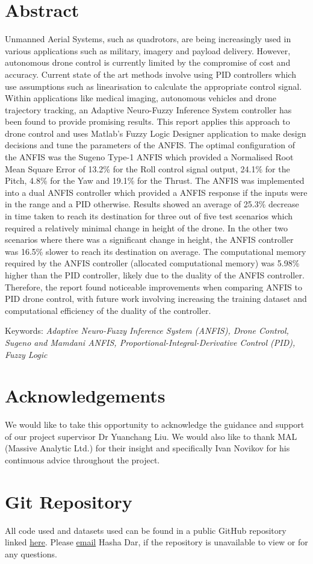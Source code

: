 \section*{Abstract}
Unmanned Aerial Systems, such as quadrotors, are being increasingly used in various applications such as military, imagery and payload delivery. However, autonomous drone control is currently limited by the compromise of cost and accuracy. Current state of the art methods involve using PID controllers which use assumptions such as linearisation to calculate the appropriate control signal. Within applications like medical imaging, autonomous vehicles and drone trajectory tracking, an Adaptive Neuro-Fuzzy Inference System controller has been found to provide promising results. This report applies this approach to drone control and uses Matlab's Fuzzy Logic Designer application to make design decisions and tune the parameters of the ANFIS. The optimal configuration of the ANFIS was the Sugeno Type-1 ANFIS which provided a Normalised Root Mean Square Error of 13.2\% for the Roll control signal output, 24.1\% for the Pitch, 4.8\% for the Yaw and 19.1\% for the Thrust. The ANFIS was implemented into a dual ANFIS controller which provided a ANFIS response if the inputs were in the range and a PID otherwise. Results showed an average of 25.3\% decrease in time taken to reach its destination for three out of five test scenarios which required a relatively minimal change in height of the drone. In the other two scenarios where there was a significant change in height, the ANFIS controller was 16.5\% slower to reach its destination on average. The computational memory required by the ANFIS controller (allocated computational memory) was 5.98\% higher than the PID controller, likely due to the duality of the ANFIS controller. Therefore, the report found noticeable improvements when comparing ANFIS to PID drone control, with future work involving increasing the training dataset and computational efficiency of the duality of the controller.

Keywords: \textit{Adaptive Neuro-Fuzzy Inference System (ANFIS), Drone Control, Sugeno and Mamdani ANFIS, Proportional-Integral-Derivative Control (PID), Fuzzy Logic}
\section*{Acknowledgements}
We would like to take this opportunity to acknowledge the guidance and support of our project supervisor Dr Yuanchang Liu. We would also like to thank MAL (Massive Analytic Ltd.) for their insight and specifically Ivan Novikov for his continuous advice throughout the project. 
\section*{Git Repository}
All code used and datasets used can be found in a public GitHub repository linked \href{https://github.com/hashadar/MECH0073-Project-3}{here}. Please \href{hasha.dar.19@ucl.ac.uk}{email} Hasha Dar, if the repository is unavailable to view or for any questions. 